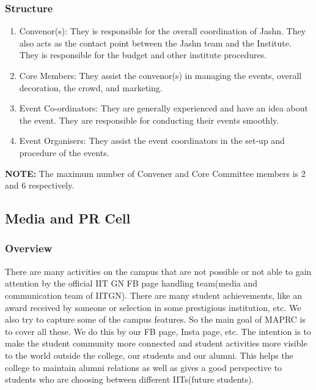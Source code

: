 \documentclass[12pt]{article}
\begin{document}
\subsubsection{Structure}
\begin{enumerate}
    \item Convenor(s): They is responsible for the overall coordination of Jashn. They also acts as the contact point between the Jashn team and the Institute. They is responsible for the budget and other institute procedures.
    \item Core Members: They assist the convenor(s) in managing the events, overall decoration, the crowd, and marketing.
    \item Event Co-ordinators: They are generally experienced and have an idea about the event. They are responsible for conducting their events smoothly.
    \item Event Organisers: They assist the event coordinators in the set-up and procedure of the events.
\end{enumerate}
\textbf{NOTE:} The  maximum  number  of  Convener  and  Core  Committee  members  is  2  and  6 respectively.

\subsection{Media and PR Cell}
\subsubsection{Overview}
There are many activities on the campus that are not possible or not able to gain attention by the official IIT GN FB page handling team(media and communication team of IITGN). There are many student achievements, like an award received by someone or selection in some prestigious institution, etc. We also try to capture some of the campus features. So the main goal of MAPRC is to cover all these. We do this by our  FB page, Insta page, etc.  The intention is to make the student community more connected and student activities more visible to the world outside the college, our students and our alumni. This helps the college to maintain alumni relations as well as gives a good perspective to students who are choosing between different IITs(future students).
\end{document}

